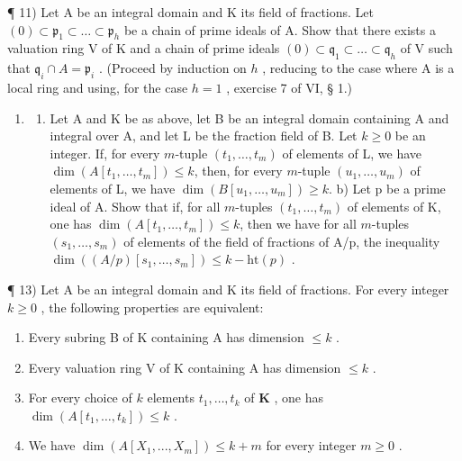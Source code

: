 ¶ 11) Let A be an integral domain and K its field of fractions. Let \((0) \subset \mathfrak{p}_1 \subset \ldots \subset \mathfrak{p}_h\) be a chain of prime ideals of A. Show that there exists a valuation ring V of K and a chain of prime ideals \((0) \subset \mathfrak{q}_1 \subset \ldots \subset \mathfrak{q}_h\) of V such that \(\mathfrak{q}_i \cap A = \mathfrak{p}_i\) . (Proceed by induction on \(h\) , reducing to the case where A is a local ring and using, for the case \(h = 1\) , exercise 7 of VI, § 1.)

\begin{enumerate}
\def\labelenumi{\arabic{enumi})}
\setcounter{enumi}{11}
\tightlist
\item
  \begin{enumerate}
  \def\labelenumii{\alph{enumii})}
  \tightlist
  \item
    Let A and K be as above, let B be an integral domain containing A and integral over A, and let L be the fraction field of B. Let \(k \geqslant 0\) be an integer. If, for every \(m\)-tuple \((t_1, \ldots, t_m)\) of elements of L, we have \(\dim(A[t_1, \ldots, t_m]) \leqslant k\), then, for every \(m\)-tuple \((u_1, \ldots, u_m)\) of elements of L, we have \(\dim(B[u_1, \ldots, u_m]) \geqslant k\). b) Let p be a prime ideal of A. Show that if, for all \(m\)-tuples \((t_1, \ldots, t_m)\) of elements of K, one has \(\dim(A[t_1, \ldots, t_m]) \leqslant k\), then we have for all \(m\)-tuples \((s_1, \ldots, s_m)\) of elements of the field of fractions of A/p, the inequality \(\dim((A/p)[s_1, \ldots, s_m]) \leqslant k - \text{ht}(p)\) .
  \end{enumerate}
\end{enumerate}

¶ 13) Let A be an integral domain and K its field of fractions. For every integer \(k \geqslant 0\) , the following properties are equivalent:

\begin{enumerate}
\def\labelenumi{(\roman{enumi})}
\item
  Every subring B of K containing A has dimension \(\leqslant k\) .
\item
  Every valuation ring V of K containing A has dimension \(\leqslant k\) .
\item
  For every choice of \(k\) elements \(t_1, \ldots, t_k\) of \(\mathbf{K}\) , one has \(\dim(A[t_1, \ldots, t_k]) \leqslant k\) .
\item
  We have \(\dim(A[X_1, ..., X_m]) \leqslant k + m\) for every integer \(m \geqslant 0\) .
\end{enumerate}

